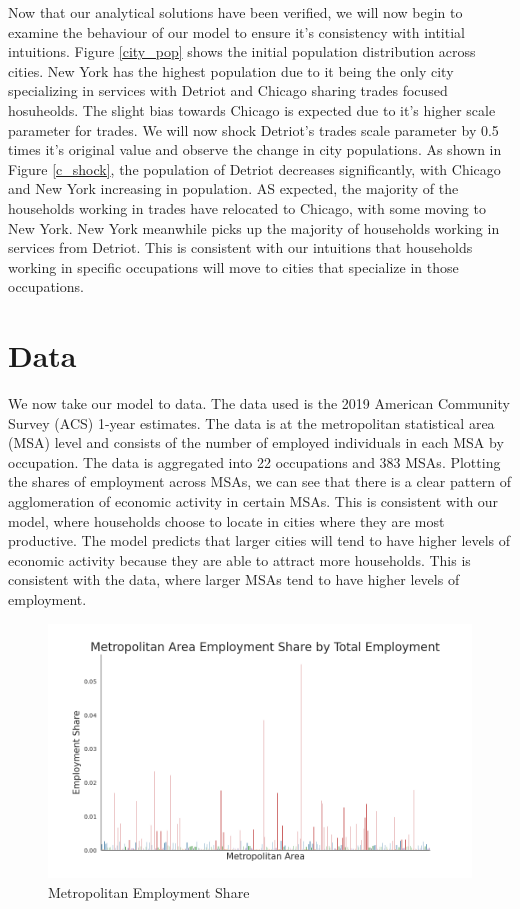 \documentclass[10pt]{article}
\begin{document}
Now that our analytical solutions have been verified, we will now begin to examine the behaviour of our model to ensure it's consistency with intitial intuitions. Figure \ref{city_pop} shows the initial population distribution across cities. New York has the highest population due to it being the only city specializing in services with Detriot and Chicago sharing trades focused hosuheolds. The slight bias towards Chicago is expected due to it's higher scale parameter for trades. We will now shock Detriot's trades scale parameter by 0.5 times it's original value and observe the change in city populations. As shown in Figure \ref{c_shock}, the population of Detriot decreases significantly, with Chicago and New York increasing in population. AS expected, the majority of the households working in trades have relocated to Chicago, with some moving to New York. New York meanwhile picks up the majority of households working in services from Detriot. This is consistent with our intuitions that households working in specific occupations will move to cities that specialize in those occupations.

\section{Data}

We now take our model to data. The data used is the 2019 American Community Survey (ACS) 1-year estimates. The data is at the metropolitan statistical area (MSA) level and consists of the number of employed individuals in each MSA by occupation. The data is aggregated into 22 occupations and 383 MSAs. Plotting the shares of employment across MSAs, we can see that there is a clear pattern of agglomeration of economic activity in certain MSAs. This is consistent with our model, where households choose to locate in cities where they are most productive. The model predicts that larger cities will tend to have higher levels of economic activity because they are able to attract more households. This is consistent with the data, where larger MSAs tend to have higher levels of employment.

\begin{figure}[!htb]
    \centering
    \includegraphics[width=\textwidth]{../../estimations/graphs/city_employment_share.png}
    \caption{Metropolitan Employment Share}
    \label{city_employment_share}
\end{figure}
\end{document}
